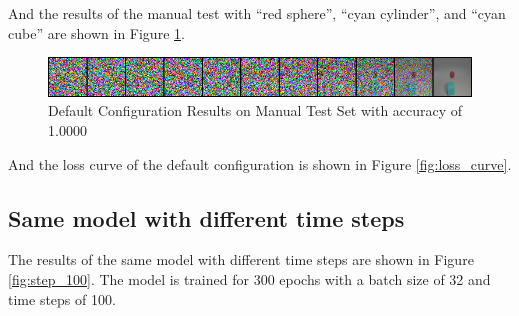 And the results of the manual test with ``red sphere'', ``cyan cylinder'', and ``cyan cube'' are shown in Figure \ref{fig:default_manual}.
\begin{figure}[h]
    \centering
    \includegraphics[width=\textwidth]{figures/default_manual_test.png}
    \caption{Default Configuration Results on Manual Test Set with accuracy of 1.0000}
    \label{fig:default_manual}
\end{figure}

And the loss curve of the default configuration is shown in Figure \ref{fig:loss_curve}.

\subsection{Same model with different time steps}

The results of the same model with different time steps are shown in Figure \ref{fig:step_100}.
The model is trained for 300 epochs with a batch size of 32 and time steps of 100.

